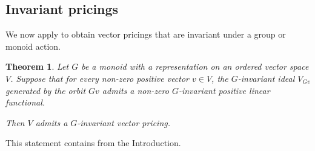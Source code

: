 \documentclass[11pt]{amsart}
\numberwithin{equation}{section}
\newtheorem{thm}{Theorem}[section]
\theoremstyle{definition}
\theoremstyle{definition}
\begin{document}
\subsection{Invariant pricings}%
We now apply  to obtain vector pricings that are invariant under a group or monoid action.

\begin{thm}\label{thm:invariant-VP}
Let $G$ be a monoid with a representation on an ordered vector space $V$. Suppose that for every non-zero positive vector $v \in V$, the $G$-invariant ideal $V_{G v}$ generated by the orbit $Gv$ admits a non-zero $G$-invariant positive linear functional.

Then $V$ admits a $G$-invariant vector pricing. 
\end{thm}

This statement contains  from the Introduction.
\end{document}
